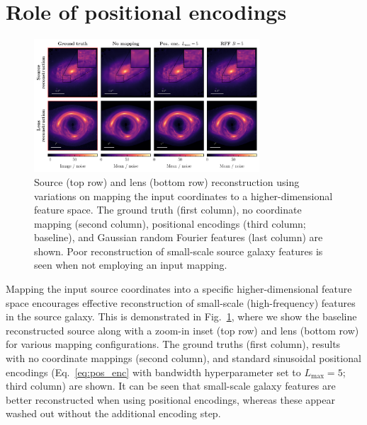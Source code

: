 \documentclass[nohyperref]{article}
\theoremstyle{plain}
\theoremstyle{definition}
\theoremstyle{remark}
\begin{document}



\newpage
\appendix
\onecolumn

\section{Role of positional encodings}
\label{app:pos_enc}

\begin{figure}[!ht]
\centering
\includegraphics[width=0.75\textwidth]{figures/variations.pdf}
\vspace{-1em}
\caption{Source (top row) and lens (bottom row) reconstruction using variations on mapping the input coordinates to a higher-dimensional feature space. The ground truth (first column), no coordinate mapping (second column), positional encodings (third column; baseline), and Gaussian random Fourier features (last column) are shown. Poor reconstruction of small-scale source galaxy features is seen when not employing an input mapping.}
\label{fig:encodings}
\vspace{-0.5em}
\end{figure}

Mapping the input source coordinates into a specific higher-dimensional feature space encourages effective reconstruction of small-scale (high-frequency) features in the source galaxy. This is demonstrated in Fig.~\ref{fig:encodings}, where we show the baseline reconstructed source along with a zoom-in inset (top row) and lens (bottom row) for various mapping configurations. The ground truths (first column), results with no coordinate mappings (second column), and standard sinusoidal positional encodings (Eq.~\eqref{eq:pos_enc} with bandwidth hyperparameter set to $L_\mathrm{max} = 5$; third column) are shown. It can be seen that small-scale galaxy features are better reconstructed when using positional encodings, whereas these appear washed out without the additional encoding step.
\end{document}

